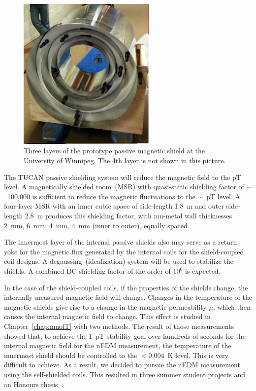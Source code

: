 \begin{figure}[h!]
  \centering
  \includegraphics[width=0.6\textwidth]{prototype_shields.png}
  \caption[TUCAN's prototype passive shielding]{Three layers of the
    prototype passive magnetic shield at the University of
    Winnipeg. The 4th layer is not shown in this picture.}
  \label{fig:prototype_shields}
\end{figure}
The TUCAN passive shielding system will reduce the magnetic field to
the pT level.
A magnetically shielded room~(MSR) with quasi-static
shielding factor of $\sim$~100,000 is sufficient to reduce the magnetic
fluctuations to the $\sim$~pT level. A four-layer MSR with an inner
cubic space of side-length 1.8~m and outer side-length 2.8~m produces
this shielding factor, with mu-metal wall thicknesses 2~mm, 6~mm,
4~mm, 4~mm (inner to outer), equally spaced.


The innermost layer of the internal passive shields also may serve as
a return yoke for the magnetic flux generated by the internal coils
for the shield-coupled coil designs. A degaussing~(idealization)
system will be used to stabilize the shields. A combined DC shielding
factor of the order of $10^6$ is expected.


In the case of the shield-coupled coils, if the properties of the
shields change, the internally measured magnetic field will change.
Changes in the temperature of the magnetic shields give rise to a
change in the magnetic permeability $\mu$, which then causes the
internal magnetic field to change. This effect is studied in
Chapter~\ref{chap:muofT} with two methods. The result of those
measurements showed that, to achieve the 1~pT stability goal over
hundreds of seconds for the internal magnetic field for the nEDM
measurement, the temperature of the innermost shield should be
controlled to the $<0.004$~K level. This is very difficult to
achieve. As a result, we decided to pursue the nEDM measurement using
the self-shielded coils. This resulted in three summer student
projects and an Honours thesis~\cite{Rosie_thesis}.


